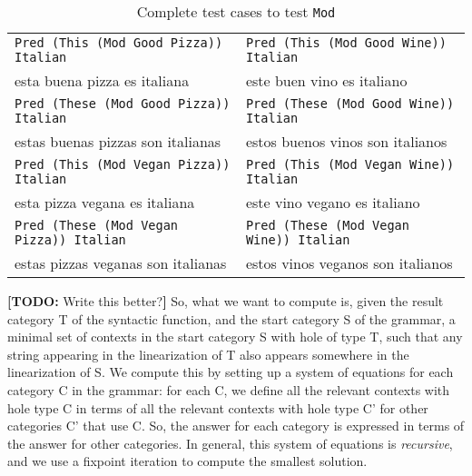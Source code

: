 \documentclass[runningheads]{llncs}
\def\t#1{\texttt{#1}}
\newcommand{\todo}[1]{{\color{cyan}\textbf{[TODO: }#1\textbf{]}}}
\begin{document}
\begin{table}
\caption{Complete test cases to test \t{Mod}}
\label{tab:testCases}
\centering
\begin{tabular}{| l | l |}
\hline
\t{Pred (This (Mod Good Pizza)) Italian} & \t{Pred (This (Mod Good Wine))
                                        Italian} \\ 
esta buena pizza es italiana          & este buen vino es italiano \\ \hline
\t{Pred (These (Mod Good Pizza)) Italian} & \t{Pred (These (Mod Good Wine))
                                        Italian} \\ 
estas buenas pizzas son italianas          & estos buenos vinos son italianos \\ \hline
\t{Pred (This (Mod Vegan Pizza)) Italian} & \t{Pred (This (Mod Vegan Wine))
                                        Italian} \\ 
esta pizza vegana es italiana          & este vino vegano es italiano \\ \hline
\t{Pred (These (Mod Vegan Pizza)) Italian} & \t{Pred (These (Mod Vegan Wine))
                                        Italian} \\ 
estas pizzas veganas son italianas          & estos vinos veganos son italianos \\ \hline
\end{tabular}
\end{table}

\todo{Write this better?} So, what we want to compute is, given the result category T of the syntactic function, and the start category S of the grammar, a minimal set of contexts in the start category S with hole of type T, such that any string appearing in the linearization of T also appears somewhere in the linearization of S. We compute this by setting up a system of equations for each category C in the grammar: for each C, we define all the relevant contexts with hole type C in terms of all the relevant contexts with hole type C' for other categories C' that use C. So, the answer for each category is expressed in terms of the answer for other categories. In general, this system of equations is \emph{recursive}, and we use a fixpoint iteration to compute the smallest solution.
\end{document}

